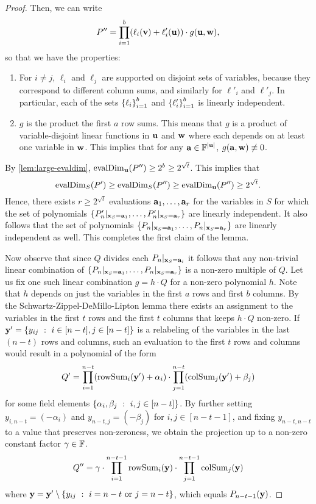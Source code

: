\documentclass[11pt]{article}
\begin{document}
\begin{proof}
Then, we can write
\[
P'' = \prod_{i=1}^b (\ell_i(\mathbf{v}) + \ell'_i(\mathbf{u})) \cdot g(\mathbf{u}, \mathbf{w}),
\]
so that we have the properties:
\begin{enumerate}
\item For $i \neq j$, $\ell_i$ and $\ell_j$ are supported on disjoint sets of variables, because they correspond to different column sums, and similarly for $\ell'_i$ and $\ell'_j$. In particular, each of the sets $\left\{ \ell_i \right\}_{i=1}^b$ and $\left\{ \ell'_i \right\}_{i=1}^b$ is linearly independent.
\item $g$ is the product the first $a$ row sums.  This means that $g$ is a product of variable-disjoint linear functions in $\mathbf{u}$ and $\mathbf{w}$ where each depends on at least one variable in $\mathbf{w}$.  This implies that for any $\veca \in \F^{|\vecu|}$, $g(\mathbf{a},\mathbf{w}) \not\equiv0$. 
\end{enumerate}
By \autoref{lem:large-evaldim}, $\operatorname{evalDim}_{\mathbf{u}}(P'') \ge 2^b \ge 2^{\sqrt{t}}$. This implies that
\[
\operatorname{evalDim}_{S}(P') \ge \operatorname{evalDim}_{S}(P'') \ge \operatorname{evalDim}_{\mathbf{u}}(P'') \ge 2^{\sqrt{t}}.
\]
Hence, there exists $r \geq 2^{\sqrt{t}}$ evaluations $\mathbf{a}_1, \ldots, \mathbf{a}_r$ for the variables in $S$ for which the set of polynomials  $\left\{ P'_n|_{\mathbf{x}_S = \mathbf{a}_1}, \ldots, P'_n|_{\mathbf{x}_S = \mathbf{a}_r} \right\}$ are linearly independent.  It also follows that the set of polynomials $\left\{ P_n|_{\mathbf{x}_S = \mathbf{a}_1}, \ldots, P_n|_{\mathbf{x}_S = \mathbf{a}_r} \right\}$ are linearly independent as well. This completes the first claim of the lemma. 

Now observe that since $Q$ divides each $P_n|_{\mathbf{x}_S = \mathbf{a}_i}$ it follows that any non-trivial linear combination of $\left\{ P_n|_{\mathbf{x}_S = \mathbf{a}_1}, \ldots, P_n|_{\mathbf{x}_S = \mathbf{a}_r} \right\}$ is a non-zero multiple of $Q$. Let us fix one such linear combination $g= h \cdot Q$ for a non-zero polynomial $h$. Note that $h$ depends on just the variables in the first $a$ rows and first $b$ columns. By the Schwartz-Zippel-DeMillo-Lipton lemma \cite{S80, Z79, DL78} there exists an assignment to the variables in the first $t$ rows and the first $t$ columns that keeps $h \cdot Q$ non-zero. If $\mathbf{y}' = \left\{  y_{ij} \ : \ i\in [n-t], j\in [n-t] \right\}$ is a relabeling of the variables in the last $(n-t)$ rows and columns, such an evaluation to the first $t$ rows and columns would result in a polynomial of the form
\[
Q' = \prod_{i=1}^{n-t} (\mathrm{rowSum}_i(\mathbf{y}')  + \alpha_i) \cdot \prod_{j=1}^{n-t} (\mathrm{colSum}_j(\mathbf{y}')  + \beta_j)
\]
for some field elements $\left\{  \alpha_i,\beta_j \ : \ i,j\in [n-t] \right\}$. By further setting $y_{i,n-t} = (-\alpha_i)$  and $y_{n-t,j} = (-\beta_j)$ for $i,j \in [n-t-1]$, and fixing $y_{n-t,n-t}$ to a value that preserves non-zeroness, we obtain the projection up to a non-zero constant factor $\gamma \in \F$.
\[
Q'' = \gamma \cdot \prod_{i=1}^{n-t-1} \mathrm{rowSum}_i(\mathbf{y}) \cdot \prod_{j=1}^{n-t-1} \mathrm{colSum}_j(\mathbf{y})
\]
where $\mathbf{y} = \mathbf{y}' \setminus \left\{  y_{ij} \ : \ i=n-t \text{ or } j=n-t \right\}$, which equals $P_{n-t-1}(\mathbf{y})$. 
\end{proof}
\end{document}
